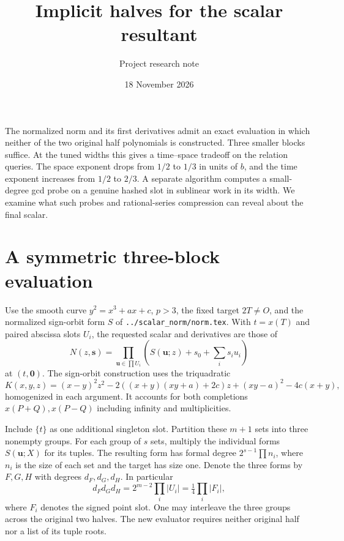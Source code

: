 \documentclass[11pt]{article}
\title{Implicit halves for the scalar resultant}
\author{Project research note}
\date{18 November 2026}
\begin{document}
\maketitle

The normalized norm and its first derivatives admit an exact evaluation
in which neither of the two original half polynomials is constructed.
Three smaller blocks suffice. At the tuned widths this gives a
time--space tradeoff on the relation queries. The space exponent
drops from $1/2$ to $1/3$ in units of $b$, and the time exponent
increases from $1/2$ to $2/3$. A separate algorithm computes a
small-degree gcd probe on a genuine hashed slot in sublinear work
in its width. We examine what such probes and rational-series
compression can reveal about the final scalar.

\section{A symmetric three-block evaluation}
Use the smooth curve $y^2=x^3+ax+c$, $p>3$, the fixed target
$2T\ne O$, and the normalized sign-orbit form $S$ of
\texttt{../scalar\_norm/norm.tex}. With $t=x(T)$ and paired
abscissa slots $U_i$, the requested scalar and derivatives are
those of
\[
 N(z,\mathbf s)=
 \prod_{\mathbf u\in\prod U_i}\left(S(\mathbf u;z)
                     +s_0+\sum_i s_i u_i\right)
\]
at $(t,\mathbf0)$. The sign-orbit construction uses the triquadratic
\[
 K(x,y,z)=(x-y)^2z^2-2((x+y)(xy+a)+2c)z+(xy-a)^2-4c(x+y),
\]
homogenized in each argument. It accounts for both completions
$x(P+Q),x(P-Q)$ including infinity and multiplicities.

Include $\{t\}$ as one additional singleton slot. Partition these
$m+1$ sets into three nonempty groups. For each group of $s$ sets,
multiply the individual forms $S(\mathbf u;X)$ for its tuples.
The resulting form has formal degree $2^{s-1}\prod n_i$, where
$n_i$ is the size of each set and the target has size one. Denote
the three forms by $F,G,H$ with degrees $d_F,d_G,d_H$. In particular
\begin{equation}
    d_F d_G d_H=2^{m-2}\prod_i|U_i|=\tfrac14\prod_i|F_i|,
    \label{eq:volume}
\end{equation}
where $F_i$ denotes the signed point slot. One may interleave the
three groups across the original two halves. The new evaluator
requires neither original half nor a list of its tuple roots.
\end{document}

